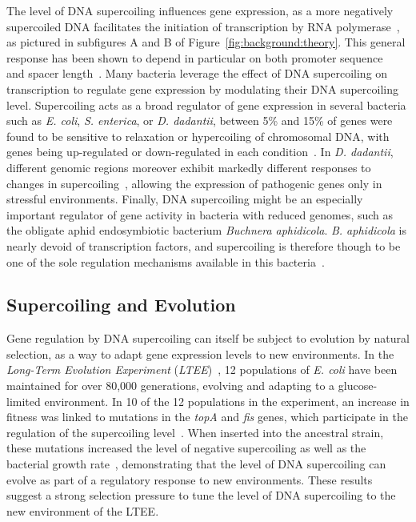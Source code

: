The level of DNA supercoiling influences gene expression, as a more negatively supercoiled DNA facilitates the initiation of transcription by RNA polymerase~\citep{elhoudaigui2019}, as pictured in subfigures A and B of Figure~\ref{fig:background:theory}.
This general response has been shown to depend in particular on both promoter sequence~\citep{forquet2021} and spacer length~\citep{forquet2022}.
Many bacteria leverage the effect of DNA supercoiling on  transcription to regulate gene expression by modulating their DNA supercoiling level.
Supercoiling acts as a broad regulator of gene expression in several bacteria such as \emph{E. coli}, \emph{S. enterica}, or \emph{D. dadantii}, between 5\% and 15\% of genes were found to be sensitive to relaxation or hypercoiling of chromosomal DNA, with genes being up-regulated or down-regulated in each condition~\citep{peter2004, ferrandiz2010, webber2013, pineau2022a}.
In \emph{D. dadantii}, different genomic regions moreover exhibit markedly different responses to changes in supercoiling~\citep{muskhelishvili2019}, allowing the expression of pathogenic genes only in stressful environments.
Finally, DNA supercoiling might be an especially important regulator of gene activity in bacteria with reduced genomes, such as the obligate aphid endosymbiotic bacterium \emph{Buchnera aphidicola}.
\emph{B. aphidicola} is nearly devoid of transcription factors, and supercoiling is therefore though to be one of the sole regulation mechanisms available in this bacteria~\citep{brinza2013}.

\subsection{Supercoiling and Evolution}

Gene regulation by DNA supercoiling can itself be subject to evolution by natural selection, as a way to adapt gene expression levels to new environments.
In the \emph{Long-Term Evolution Experiment} (\emph{LTEE})~\citep{lenski1991}, 12 populations of \emph{E. coli} have been maintained for over 80,000 generations, evolving and adapting to a glucose-limited environment.
In 10 of the 12 populations in the experiment, an increase in fitness was linked to mutations in the \emph{topA} and \emph{fis} genes, which participate in the regulation of the supercoiling level~\citep{crozat2010}.
When inserted into the ancestral strain, these mutations increased the level of negative supercoiling as well as the bacterial growth rate~\citep{crozat2005}, demonstrating that the level of DNA supercoiling can evolve as part of a regulatory response to new environments.
These results suggest a strong selection pressure to tune the level of DNA supercoiling to the new environment of the LTEE.

